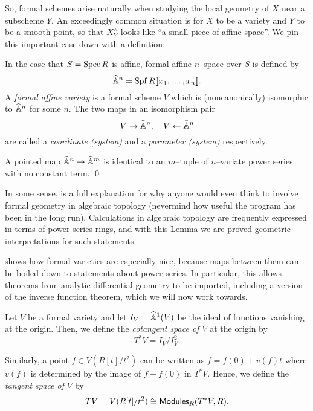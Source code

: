\noindent So, formal schemes arise naturally when studying the local geometry of $X$ near a subscheme $Y$.  An exceedingly common situation is for $X$ to be a variety and $Y$ to be a smooth point, so that $X^\wedge_Y$ looks like ``a small piece of affine space''.  We pin this important case down with a definition:

\begin{definition}
In the case that $S = \operatorname{Spec} R$ is affine, formal affine $n$--space over $S$ is defined by \[\widehat{\mathbb{A}}^n = \operatorname{Spf} R\llbracket x_1, \ldots, x_n\rrbracket.\]  A \textit{formal affine variety} is a formal scheme $V$ which is (noncanonically) isomorphic to $\widehat{\mathbb{A}}^n$ for some $n$.  The two maps in an isomorphism pair \[V \to \widehat{\mathbb{A}}^n, \quad V \leftarrow \widehat{\mathbb{A}}^n\] are called a \textit{coordinate (system)} and a \textit{parameter (system)} respectively.
\end{definition}

\begin{lemma}\label{MapsOfFVarsArePowerSeries}
A pointed map $\widehat{\mathbb{A}}^n \to \widehat{\mathbb{A}}^m$ is identical to an $m$--tuple of $n$--variate power series with no constant term. \qed
\end{lemma}

\begin{remark}
In some sense,  is a full explanation for why anyone would even think to involve formal geometry in algebraic topology (nevermind how useful the program has been in the long run).  Calculations in algebraic topology are frequently expressed in terms of power series rings, and with this Lemma we are proved geometric interpretations for such statements.
\end{remark}

 shows how formal varieties are especially nice, because maps between them can be boiled down to statements about power series.  In particular, this allows theorems from analytic differential geometry to be imported, including a version of the inverse function theorem, which we will now work towards.

\begin{definition}
Let $V$ be a formal variety and let $I_V = \widehat{\mathbb{A}}^1(V)$ be the ideal of functions vanishing at the origin.  Then, we define the \textit{cotangent space of $V$} at the origin by \[T^* V = I_V / I_V^2.\]
\end{definition}

\begin{definition}
Similarly, a point $f \in V(R[t] / t^2)$ can be written as $f = f(0) + v(f) t$ where $v(f)$ is determined by the image of $f - f(0)$ in $T^* V$.  Hence, we define the \textit{tangent space of $V$} by \[TV = V(R[t] / t^2) \cong \mathsf{Modules}_R(T^* V, R).\]
\end{definition}

